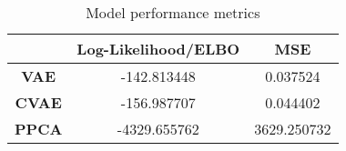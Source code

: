 \begin{table}
\centering
\caption{Model performance metrics}
\label{table:metrics}
\begin{tabular}{ccc}
\toprule
{} &  \textbf{Log-Likelihood/ELBO} &  \textbf{MSE} \\
\midrule
\textbf{VAE } &                   -142.813448 &      0.037524 \\
\textbf{CVAE} &                   -156.987707 &      0.044402 \\
\textbf{PPCA} &                  -4329.655762 &   3629.250732 \\
\bottomrule
\end{tabular}
\end{table}
